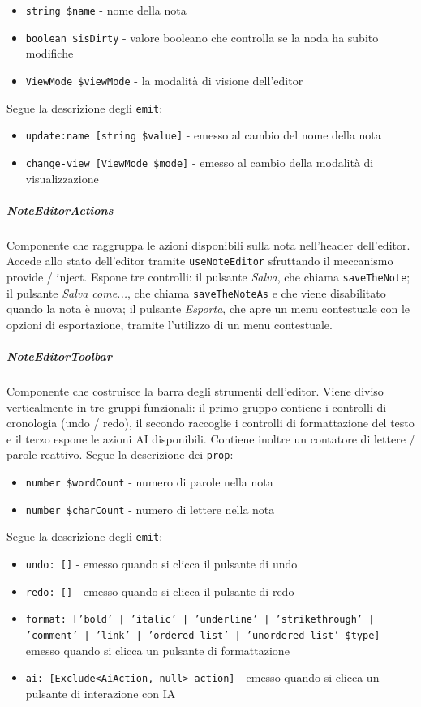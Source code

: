 \documentclass[a4paper,10pt]{article}
\begin{document}
\begin{itemize}
    \item \texttt{string \$name} - nome della nota
    \item \texttt{boolean \$isDirty} - valore booleano che controlla se la noda ha subito modifiche
    \item \texttt{ViewMode \$viewMode} - la modalità di visione dell'editor
\end{itemize}
Segue la descrizione degli \texttt{emit}:
\begin{itemize}
    \item \texttt{update:name [string \$value]} - emesso al cambio del nome della nota
    \item \texttt{change-view [ViewMode \$mode]} - emesso al cambio della modalità di visualizzazione
\end{itemize}
\subparagraph{NoteEditorActions} Componente che raggruppa le azioni disponibili sulla nota nell'header dell'editor. Accede allo stato dell'editor tramite \texttt{useNoteEditor} sfruttando il meccanismo provide / inject. Espone tre controlli: il pulsante \textit{Salva}, che chiama \texttt{saveTheNote}; il pulsante \textit{Salva come...}, che chiama \texttt{saveTheNoteAs} e che viene disabilitato quando la nota è nuova; il pulsante \textit{Esporta}, che apre un menu contestuale con le opzioni di esportazione, tramite l'utilizzo di un menu contestuale.
\subparagraph{NoteEditorToolbar} Componente che costruisce la barra degli strumenti dell'editor. Viene diviso verticalmente in tre gruppi funzionali: il primo gruppo contiene i controlli di cronologia (undo / redo), il secondo raccoglie i controlli di formattazione del testo e il terzo espone le azioni AI disponibili. Contiene inoltre un contatore di lettere / parole reattivo. Segue la descrizione dei \texttt{prop}:
\begin{itemize}
    \item \texttt{number \$wordCount} - numero di parole nella nota
    \item \texttt{number \$charCount} - numero di lettere nella nota
\end{itemize}
Segue la descrizione degli \texttt{emit}:
\begin{itemize}
    \item \texttt{undo: []} - emesso quando si clicca il pulsante di undo
    \item \texttt{redo: []} - emesso quando si clicca il pulsante di redo
    \item \texttt{format: ['bold' | 'italic' | 'underline' | 'strikethrough' | 'comment' | 'link' | 'ordered\_list' | 'unordered\_list' \$type]} - emesso quando si clicca un pulsante di formattazione
    \item \texttt{ai: [Exclude<AiAction, null> action]} - emesso quando si clicca un pulsante di interazione con IA
\end{itemize}
\end{document}
